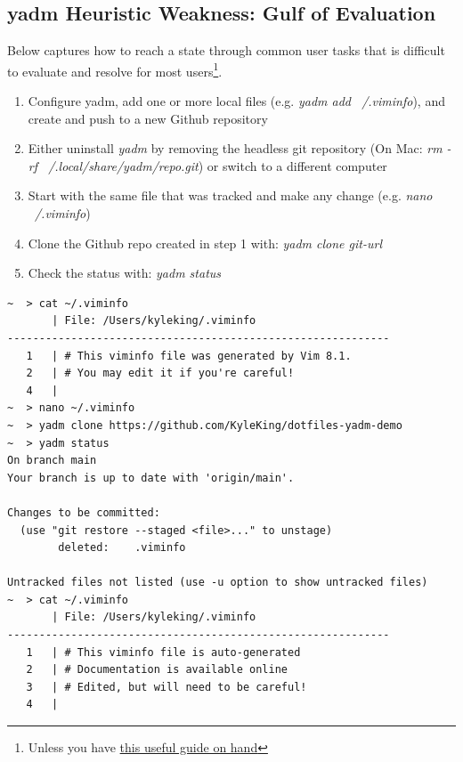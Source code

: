 \documentclass[letterpaper]{jdf}
\begin{document}
\subsection{yadm Heuristic Weakness: Gulf of Evaluation}\label{appendix:yadm_pull_deletes}
Below captures how to reach a state through common user tasks that is difficult to evaluate and resolve for most users\footnote{Unless you have \href{https://ohshitgit.com/}{this useful guide on hand}}.

\begin{enumerate}
    \item Configure yadm, add one or more local files (e.g. \emph{yadm add ~/.viminfo}), and create and push to a new Github repository
    \item Either uninstall \emph{yadm} by removing the headless git repository (On Mac: \emph{rm -rf ~/.local/share/yadm/repo.git}) or switch to a different computer
    \item Start with the same file that was tracked and make any change (e.g. \emph{nano ~/.viminfo})
    \item Clone the Github repo created in step 1 with: \emph{yadm clone git-url}
    \item Check the status with: \emph{yadm status}
\end{enumerate}

\begin{jdffigure}
\begin{verbatim}
~  > cat ~/.viminfo
       | File: /Users/kyleking/.viminfo
------------------------------------------------------------
   1   | # This viminfo file was generated by Vim 8.1.
   2   | # You may edit it if you're careful!
   4   |
~  > nano ~/.viminfo
~  > yadm clone https://github.com/KyleKing/dotfiles-yadm-demo
~  > yadm status
On branch main
Your branch is up to date with 'origin/main'.

Changes to be committed:
  (use "git restore --staged <file>..." to unstage)
        deleted:    .viminfo

Untracked files not listed (use -u option to show untracked files)
~  > cat ~/.viminfo
       | File: /Users/kyleking/.viminfo
------------------------------------------------------------
   1   | # This viminfo file is auto-generated
   2   | # Documentation is available online
   3   | # Edited, but will need to be careful!
   4   |
\end{verbatim}
\label{fig:yadm_pull_deletes}
\end{jdffigure}
\end{document}

